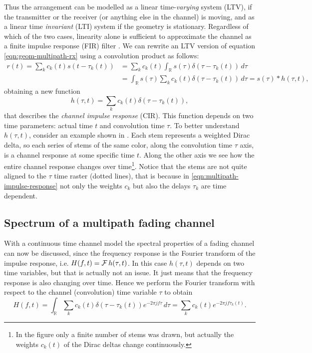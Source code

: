 Thus the arrangement can be modelled as a linear time-\emph{varying} system (LTV), if the transmitter or the receiver (or anything else in the channel) is moving, and as a linear time \emph{invariant} (LTI) system if the geometry is stationary. Regardless of which of the two cases, linearity alone is sufficient to approximate the channel as a finite impulse response (FIR) filter \cite{Messier}. We can rewrite an LTV version of equation \eqref{eqn:geom-multipath-rx} using a convolution product as follows:
\begin{align*}
	r(t) = \sum_k c_k(t) s(t - \tau_k(t)) &= \sum_k c_k(t) \int_\mathbb{R} s(\tau) \delta(\tau - \tau_k(t)) \,d\tau \\
		&= \int_\mathbb{R} s(\tau) \sum_k c_k(t) \delta(\tau - \tau_k(t)) \,d\tau = s(\tau) * h(\tau, t),
\end{align*}
obtaining a new function
\begin{equation} \label{eqn:multipath-impulse-response}
	h(\tau, t) = \sum_k c_k(t) \delta(\tau - \tau_k(t)),
\end{equation}
that describes the \emph{channel impulse response} (CIR). This function depends on two time parameters: actual time \(t\) and convolution time \(\tau\). To better understand \(h(\tau, t)\), consider an example shown in . Each stem represents a weighted Dirac delta, so each series of stems of the same color, along the convolution time \(\tau\) axis, is a channel response at some specific time \(t\). Along the other axis we see how the entire channel response changes over time\footnote{In the figure only a finite number of stems was drawn, but actually the weights \(c_k(t)\) of the Dirac deltas change continuously.}. Notice that the stems are not quite aligned to the \(\tau\) time raster (dotted lines), that is because in \eqref{eqn:multipath-impulse-response} not only the weights \(c_k\) but also the delays \(\tau_k\) are time dependent.

\subsection{Spectrum of a multipath fading channel}

With a continuous time channel model the spectral properties of a fading channel can now be discussed, since the frequency response is the Fourier transform of the impulse response, i.e. \(H(f, t) = \operatorname{\mathcal{F}} h(\tau, t)\). In this case \(h(\tau, t)\) depends on two time variables, but that is actually not an issue. It just means that the frequency response is also changing over time. Hence we perform the Fourier transform with respect to the channel (convolution) time variable \(\tau\) to obtain
\begin{equation} \label{eqn:multipath-frequency-response}
	H(f, t) = \int_\mathbb{R} \sum_k c_k(t) \delta(\tau - \tau_k(t)) e^{-2\pi jf\tau} \, d\tau
	= \sum_k c_k(t) e^{-2\pi jf \tau_k(t)}.
\end{equation}

